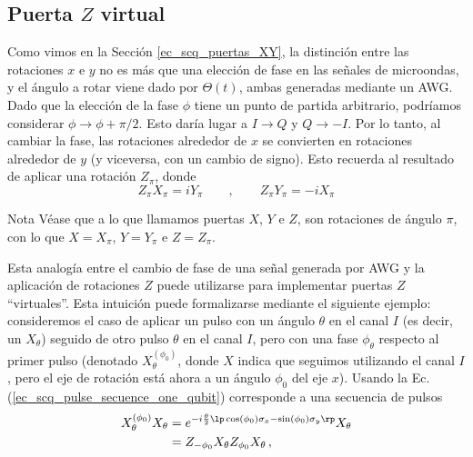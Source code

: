        

    \subsection{Puerta $Z$ virtual}

    Como vimos en la Sección \ref{ec_scq_puertas_XY}, la distinción entre las rotaciones $x$ e $y$ no es más que una elección de fase en las señales de microondas, y el ángulo a rotar viene dado por $\Theta (t)$, ambas generadas mediante un AWG. Dado que la elección de la fase $\phi$ tiene un punto de partida arbitrario, podríamos considerar $\phi \rightarrow \phi + \pi/2$. Esto daría lugar a $I \rightarrow Q$ y $Q \rightarrow -I$. Por lo tanto, al cambiar la fase, las rotaciones alrededor de $x$ se convierten en rotaciones alrededor de $y$ (y viceversa, con un cambio de signo). Esto recuerda al resultado de aplicar una rotación $Z_{\pi}$, donde 
    \begin{equation}
        Z_{\pi} X_{\pi} = i Y_{\pi} 
        \qquad , \qquad
        Z_{\pi} Y_{\pi} = -i X_{\pi}
    \end{equation}

    \begin{mybox_blue}{Nota}
        Véase que a lo que llamamos puertas $X$, $Y$ e $Z$, son rotaciones de ángulo $\pi$, con lo que $X = X_{\pi}$, $Y = Y_{\pi}$ e $Z = Z_{\pi}$.
    \end{mybox_blue}

    
    Esta analogía entre el cambio de fase de una señal generada por AWG y la aplicación de rotaciones $Z$ puede utilizarse para implementar puertas $Z$ ``virtuales''. Esta intuición puede formalizarse mediante el siguiente ejemplo: consideremos el caso de aplicar un pulso con un ángulo $\theta$ en el canal $I$ (es decir, un $X_\theta$) seguido de otro pulso $\theta$ en el canal $I$, pero con una fase $\phi_\theta$ respecto al primer pulso (denotado $X_\theta^{(\phi_0)}$, donde $X$ indica que seguimos utilizando el canal $I$, pero el eje de rotación está ahora a un ángulo $\phi_0$ del eje $x$). Usando la Ec. (\ref{ec_scq_pulse_secuence_one_qubit}) corresponde a una secuencia de pulsos
    \begin{equation} \label{ec_scq_virtual_x_gate_ejemplo}
        \begin{aligned}
            X_\theta^{(\phi_0)} X_\theta & = e^{-i \frac{\theta}{2} \lp \cos(\phi_0) \sigma_x - \sin(\phi_0) \sigma_y \rp } X_\theta \\
            & = Z_{-\phi_0} X_\theta Z_{\phi_0} X_\theta \, ,
        \end{aligned}
    \end{equation}
    
